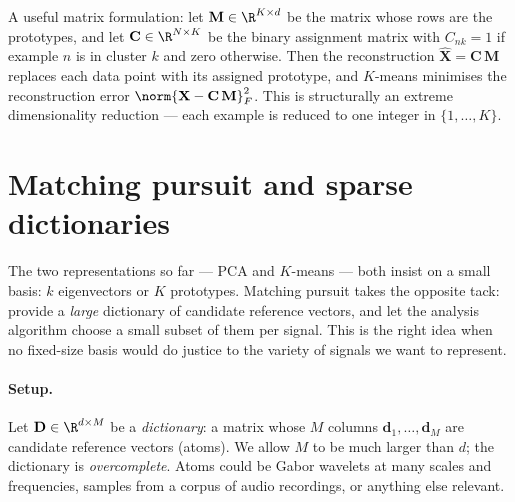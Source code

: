 
A useful matrix formulation: let $\mathbf{M} \in \R^{K \times d}$ be the
matrix whose rows are the prototypes, and let $\mathbf{C} \in \R^{N
\times K}$ be the binary assignment matrix with $C_{nk} = 1$ if example
$n$ is in cluster $k$ and zero otherwise.  Then the reconstruction
$\hat{\mathbf{X}} = \mathbf{C}\, \mathbf{M}$ replaces each data point
with its assigned prototype, and $K$-means minimises the reconstruction
error $\norm{\mathbf{X} - \mathbf{C}\, \mathbf{M}}_F^2$.  This is
structurally an extreme dimensionality reduction --- each example is
reduced to one integer in $\{1, \ldots, K\}$.

\section{Matching pursuit and sparse dictionaries}
\label{sec:mp}

The two representations so far --- PCA and $K$-means --- both insist on
a small basis: $k$ eigenvectors or $K$ prototypes.  Matching pursuit
takes the opposite tack: provide a \emph{large} dictionary of candidate
reference vectors, and let the analysis algorithm choose a small subset
of them per signal.  This is the right idea when no fixed-size basis
would do justice to the variety of signals we want to represent.

\paragraph{Setup.}  Let $\mathbf{D} \in \R^{d \times M}$ be a
\emph{dictionary}: a matrix whose $M$ columns $\mathbf{d}_1, \ldots,
\mathbf{d}_M$ are candidate reference vectors (atoms).  We allow $M$
to be much larger than $d$; the dictionary is \emph{overcomplete}.
Atoms could be Gabor wavelets at many scales and frequencies, samples
from a corpus of audio recordings, or anything else relevant.

